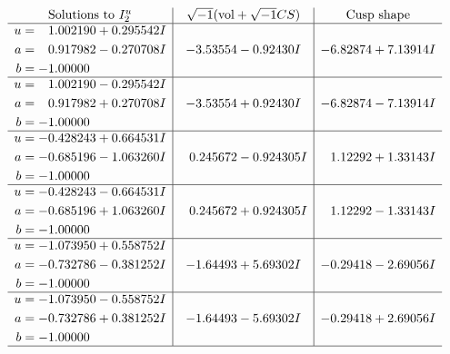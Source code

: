 \documentclass[1p]{elsarticle_modified}
\theoremstyle{definition}
\newcommand{\I}{\sqrt{-1}}
\begin{document}
$$\begin{array}{c|c|c}  
\text{Solutions to }I^u_{2}& \I (\text{vol} + \sqrt{-1}CS) & \text{Cusp shape}\\
 \hline 
\begin{aligned}
u &= \phantom{-}1.002190 + 0.295542 I \\
a &= \phantom{-}0.917982 - 0.270708 I \\
b &= -1.00000\phantom{ +0.000000I}\end{aligned}
 & -3.53554 - 0.92430 I & -6.82874 + 7.13914 I \\ \hline\begin{aligned}
u &= \phantom{-}1.002190 - 0.295542 I \\
a &= \phantom{-}0.917982 + 0.270708 I \\
b &= -1.00000\phantom{ +0.000000I}\end{aligned}
 & -3.53554 + 0.92430 I & -6.82874 - 7.13914 I \\ \hline\begin{aligned}
u &= -0.428243 + 0.664531 I \\
a &= -0.685196 - 1.063260 I \\
b &= -1.00000\phantom{ +0.000000I}\end{aligned}
 & \phantom{-}0.245672 - 0.924305 I & \phantom{-}1.12292 + 1.33143 I \\ \hline\begin{aligned}
u &= -0.428243 - 0.664531 I \\
a &= -0.685196 + 1.063260 I \\
b &= -1.00000\phantom{ +0.000000I}\end{aligned}
 & \phantom{-}0.245672 + 0.924305 I & \phantom{-}1.12292 - 1.33143 I \\ \hline\begin{aligned}
u &= -1.073950 + 0.558752 I \\
a &= -0.732786 - 0.381252 I \\
b &= -1.00000\phantom{ +0.000000I}\end{aligned}
 & -1.64493 + 5.69302 I & -0.29418 - 2.69056 I \\ \hline\begin{aligned}
u &= -1.073950 - 0.558752 I \\
a &= -0.732786 + 0.381252 I \\
b &= -1.00000\phantom{ +0.000000I}\end{aligned}
 & -1.64493 - 5.69302 I & -0.29418 + 2.69056 I\\
 \hline 
 \end{array}$$\newpage\newpage\renewcommand{\arraystretch}{1}
\end{document}

